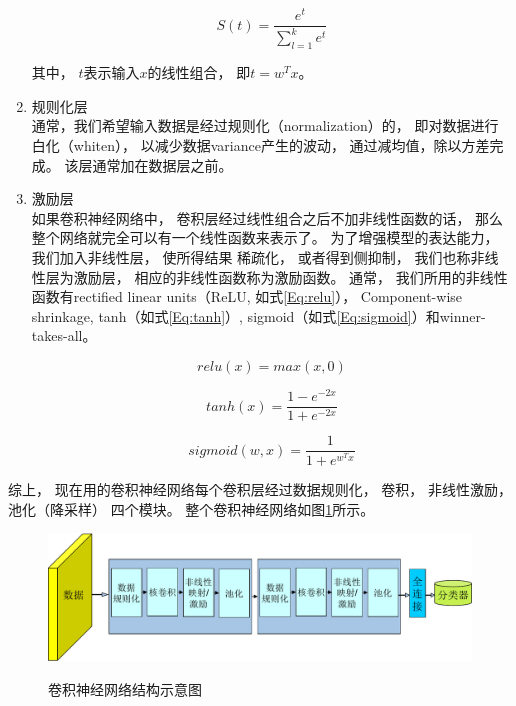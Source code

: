 \begin{enumerate}
\begin{equation}
S(t) = \frac{e^{t}}{\sum_{l=1}^k{e^t}}\label{Eq:softmax}
\end{equation}

其中， $t$表示输入$x$的线性组合， 即$t=w^Tx$。




\item 规则化层\\
通常，我们希望输入数据是经过规则化（normalization）的， 即对数据进行白化（whiten）， 以减少数据variance产生的波动， 通过减均值，除以方差完成。 该层通常加在数据层之前。

\item 激励层\\
如果卷积神经网络中， 卷积层经过线性组合之后不加非线性函数的话， 那么整个网络就完全可以有一个线性函数来表示了。 为了增强模型的表达能力， 我们加入非线性层， 使所得结果 稀疏化， 或者得到侧抑制， 我们也称非线性层为激励层， 相应的非线性函数称为激励函数。 通常， 我们所用的非线性函数有rectified linear units（ReLU, 如式\ref{Eq:relu}）， Component-wise shrinkage, tanh（如式\ref{Eq:tanh}）, sigmoid（如式\ref{Eq:sigmoid}）和winner-takes-all。

\begin{equation}\label{Eq:relu}
 relu(x) = max(x,0)
\end{equation}

\begin{equation}\label{Eq:tanh}
 tanh(x) = \frac{1-e^{-2x}}{1+e^{-2x}}
\end{equation}

\begin{equation}\label{Eq:sigmoid}
 sigmoid(w,x) = \frac{1}{1+e^{w^Tx}}
\end{equation}
\end{enumerate}

综上， 现在用的卷积神经网络每个卷积层经过数据规则化， 卷积， 非线性激励， 池化（降采样） 四个模块。 整个卷积神经网络如图\ref{fig:whole_cnn_form}所示。

\begin{figure}[htb]
  \centering
  \includegraphics[scale=0.7]{Pictures/CNN/cnn_net_diag-crop.pdf}\\
  \caption{卷积神经网络结构示意图}\label{fig:whole_cnn_form}
\end{figure}







